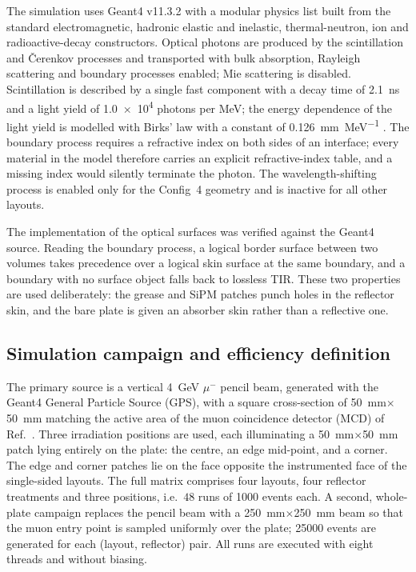\documentclass[3p]{elsarticle}
\newcommand{\gfour}{Geant4}
\newcommand{\sipm}{SiPM}
\begin{document}
The simulation uses \gfour{} v11.3.2 \cite{Agostinelli2003,Allison2016} with a
modular physics list built from the standard electromagnetic, hadronic elastic
and inelastic, thermal-neutron, ion and radioactive-decay constructors. Optical
photons are produced by the scintillation and \v{C}erenkov processes and
transported with bulk absorption, Rayleigh scattering and boundary processes
enabled; Mie scattering is disabled. Scintillation is described by a single
fast component with a decay time of \SI{2.1}{\nano\second} and a light yield of
\num{1.0e4} photons per \si{\mega\electronvolt}; the energy dependence of the
light yield is modelled with Birks' law with a constant of
\SI{0.126}{\milli\meter\per\mega\electronvolt}
\cite{Birks1951,Craun1970}. The boundary process requires a refractive index on
both sides of an interface; every material in the model therefore carries an
explicit refractive-index table, and a missing index would silently terminate
the photon. The wavelength-shifting process is enabled only for the Config~4
geometry and is inactive for all other layouts.

The implementation of the optical surfaces was verified against the \gfour{}
source. Reading the boundary process, a logical border surface between two
volumes takes precedence over a logical skin surface at the same boundary, and
a boundary with no surface object falls back to lossless TIR. These two
properties are used deliberately: the grease and \sipm{} patches punch holes in
the reflector skin, and the bare plate is given an absorber skin rather than a
reflective one.

\subsection{Simulation campaign and efficiency definition}
\label{sec:campaign}

The primary source is a vertical \SI{4}{\giga\electronvolt} $\mu^-$ pencil
beam, generated with the \gfour{} General Particle Source (GPS), with a square
cross-section of \SI{50}{\milli\meter}$\times$\SI{50}{\milli\meter} matching
the active area of the muon coincidence detector (MCD) of
Ref.~\cite{Rao2025}. Three irradiation positions are used, each illuminating a
\SI{50}{\milli\meter}$\times$\SI{50}{\milli\meter} patch lying entirely on the
plate: the centre, an edge mid-point, and a corner. The
edge and corner patches lie on the face opposite the instrumented face of the
single-sided layouts. The full matrix comprises four layouts, four reflector
treatments and three positions, i.e.\ $48$ runs of \num{1000} events each. A
second, whole-plate campaign replaces the pencil beam with a
\SI{250}{\milli\meter}$\times$\SI{250}{\milli\meter} beam so that the muon
entry point is sampled uniformly over the plate; \num{25000} events are
generated for each (layout, reflector) pair. All runs are executed with eight
threads and without biasing.
\end{document}
